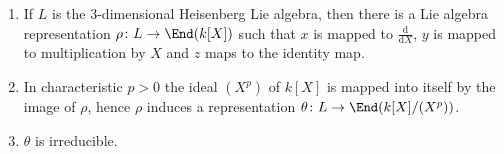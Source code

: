 \begin{enumerate}[label=(\alph*)]
	\item If $L$ is the $3$-dimensional Heisenberg Lie algebra,
		then there is a Lie algebra representation $\rho\colon L\to \End(k[X])$
		such that $x$ is mapped to $\frac{\mathrm{d}}{\mathrm{d}X}$,
		$y$ is mapped to multiplication by $X$ and $z$ maps to the
		identity map.
	\item In characteristic $p > 0$ the ideal $(X^p)$ of $k[X]$ is mapped
		into itself by the image of $\rho$, hence $\rho$ induces a representation
		$\theta\colon L\to \End(k[X]/(X^p))$.
	\item $\theta$ is irreducible.
\end{enumerate}
